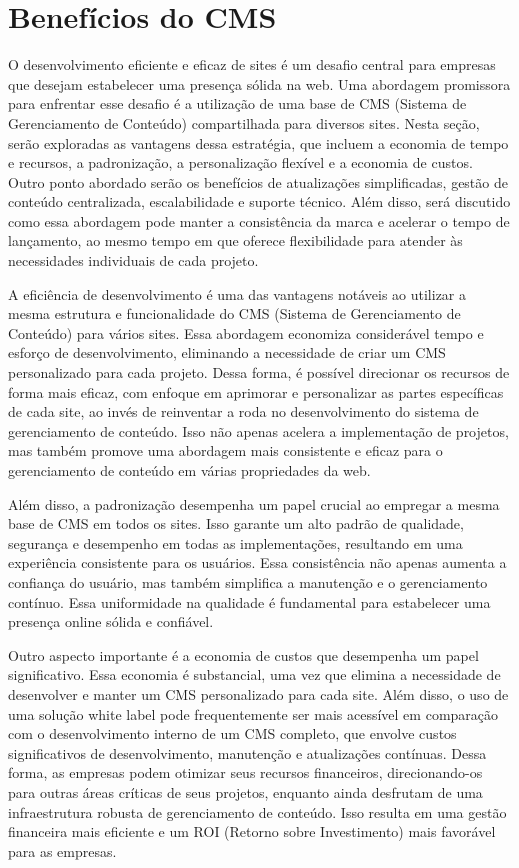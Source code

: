 \section{Benefícios do CMS}

O desenvolvimento eficiente e eficaz de sites é um desafio central para empresas que desejam estabelecer uma presença sólida na web. Uma abordagem promissora para enfrentar esse desafio é a utilização de uma base de CMS (Sistema de Gerenciamento de Conteúdo) compartilhada para diversos sites. Nesta seção, serão exploradas as vantagens dessa estratégia, que incluem a economia de tempo e recursos, a padronização, a personalização flexível e a economia de custos. Outro ponto abordado serão os benefícios de atualizações simplificadas, gestão de conteúdo centralizada, escalabilidade e suporte técnico. Além disso, será discutido como essa abordagem pode manter a consistência da marca e acelerar o tempo de lançamento, ao mesmo tempo em que oferece flexibilidade para atender às necessidades individuais de cada projeto.

A eficiência de desenvolvimento é uma das vantagens notáveis ao utilizar a mesma estrutura e funcionalidade do CMS (Sistema de Gerenciamento de Conteúdo) para vários sites. Essa abordagem economiza considerável tempo e esforço de desenvolvimento, eliminando a necessidade de criar um CMS personalizado para cada projeto. Dessa forma, é possível direcionar os recursos de forma mais eficaz, com enfoque em aprimorar e personalizar as partes específicas de cada site, ao invés de reinventar a roda no desenvolvimento do sistema de gerenciamento de conteúdo. Isso não apenas acelera a implementação de projetos, mas também promove uma abordagem mais consistente e eficaz para o gerenciamento de conteúdo em várias propriedades da web.

Além disso, a padronização desempenha um papel crucial ao empregar a mesma base de CMS em todos os sites. Isso garante um alto padrão de qualidade, segurança e desempenho em todas as implementações, resultando em uma experiência consistente para os usuários. Essa consistência não apenas aumenta a confiança do usuário, mas também simplifica a manutenção e o gerenciamento contínuo. Essa uniformidade na qualidade é fundamental para estabelecer uma presença online sólida e confiável.

Outro aspecto importante é a economia de custos que desempenha um papel significativo. Essa economia é substancial, uma vez que elimina a necessidade de desenvolver e manter um CMS personalizado para cada site. Além disso, o uso de uma solução white label pode frequentemente ser mais acessível em comparação com o desenvolvimento interno de um CMS completo, que envolve custos significativos de desenvolvimento, manutenção e atualizações contínuas. Dessa forma, as empresas podem otimizar seus recursos financeiros, direcionando-os para outras áreas críticas de seus projetos, enquanto ainda desfrutam de uma infraestrutura robusta de gerenciamento de conteúdo. Isso resulta em uma gestão financeira mais eficiente e um ROI (Retorno sobre Investimento) mais favorável para as empresas.

